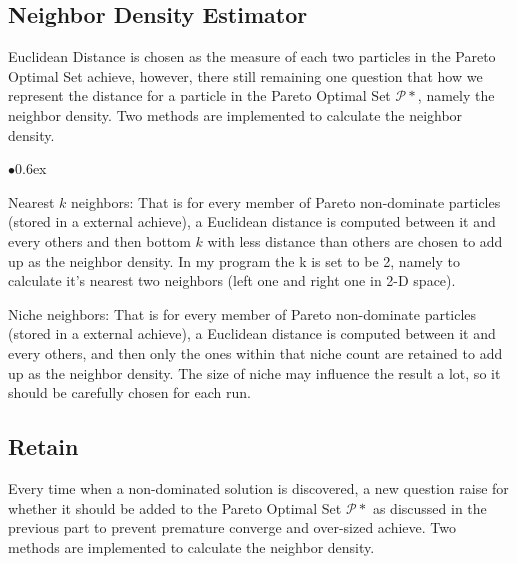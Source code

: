 \documentclass[11pt, runningheads,a4paper]{llncs}
\begin{document}
\subsection{Neighbor Density Estimator}
Euclidean Distance is chosen as the measure of each two particles in the Pareto Optimal Set achieve, however, there still remaining one question that how we represent the distance for a particle in the Pareto Optimal Set $\mathcal{P}*$, namely the neighbor density. Two methods are implemented to calculate the neighbor density. 

\begin{list}{$\bullet$}{\itemsep 0.6ex}
\item Nearest $k$ neighbors: That is for every member of Pareto non-dominate particles (stored in a external achieve), a Euclidean distance is computed between it and every others and then bottom $k$ with less distance than others are chosen to add up as the neighbor density. In my program the k is set to be 2, namely to calculate it's nearest two neighbors (left one and right one in 2-D space).
\item Niche neighbors: That is for every member of Pareto non-dominate particles (stored in a external achieve), a Euclidean distance is computed between it and every others, and then only the ones within that niche count are retained to add up as the neighbor density. The size of niche may influence the result a lot, so it should be carefully chosen for each run.
\end{list}

\subsection{Retain}
Every time when a non-dominated solution is discovered, a new question raise for whether it should be added to the Pareto Optimal Set $\mathcal{P}*$ as discussed in the previous part to prevent premature converge and over-sized achieve. Two methods are implemented to calculate the neighbor density. 
\end{document}

